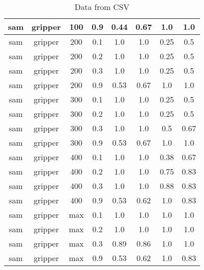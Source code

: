 \begin{table}[ht]
\begin{tabular}{c|c|c|c|c|c|c|c}
sam & gripper & 100 & 0.9 & 0.44 & 0.67 & 1.0 & 1.0 \\ \hline
sam & gripper & 200 & 0.1 & 1.0 & 1.0 & 0.25 & 0.5 \\ \hline
sam & gripper & 200 & 0.2 & 1.0 & 1.0 & 0.25 & 0.5 \\ \hline
sam & gripper & 200 & 0.3 & 1.0 & 1.0 & 0.25 & 0.5 \\ \hline
sam & gripper & 200 & 0.9 & 0.53 & 0.67 & 1.0 & 1.0 \\ \hline
sam & gripper & 300 & 0.1 & 1.0 & 1.0 & 0.25 & 0.5 \\ \hline
sam & gripper & 300 & 0.2 & 1.0 & 1.0 & 0.25 & 0.5 \\ \hline
sam & gripper & 300 & 0.3 & 1.0 & 1.0 & 0.5 & 0.67 \\ \hline
sam & gripper & 300 & 0.9 & 0.53 & 0.67 & 1.0 & 1.0 \\ \hline
sam & gripper & 400 & 0.1 & 1.0 & 1.0 & 0.38 & 0.67 \\ \hline
sam & gripper & 400 & 0.2 & 1.0 & 1.0 & 0.75 & 0.83 \\ \hline
sam & gripper & 400 & 0.3 & 1.0 & 1.0 & 0.88 & 0.83 \\ \hline
sam & gripper & 400 & 0.9 & 0.53 & 0.62 & 1.0 & 0.83 \\ \hline
sam & gripper & max & 0.1 & 1.0 & 1.0 & 1.0 & 1.0 \\ \hline
sam & gripper & max & 0.2 & 1.0 & 1.0 & 1.0 & 1.0 \\ \hline
sam & gripper & max & 0.3 & 0.89 & 0.86 & 1.0 & 1.0 \\ \hline
sam & gripper & max & 0.9 & 0.53 & 0.62 & 1.0 & 0.83 \\ \hline
\end{tabular}
\caption{Data from CSV}
\label{tab:csv_data}
\end{table}
